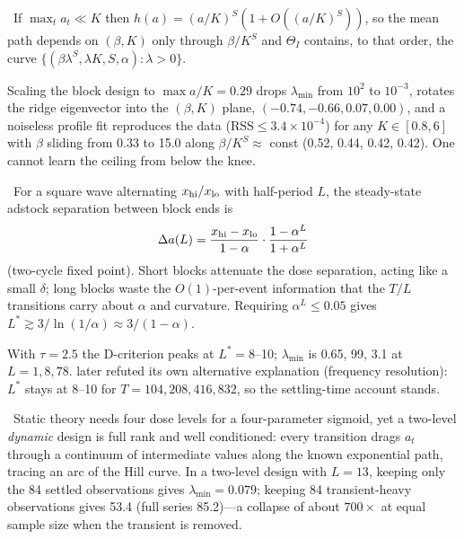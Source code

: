 \begin{proposition}
\label{ident:prop:range}
\tagTransported\ If $\max_t a_t \ll K$ then $h(a) = (a/K)^S(1 + O((a/K)^S))$, so the mean path depends on $(\beta, K)$ only through $\beta/K^S$ and $\Theta_I$ contains, to that order, the curve $\{(\beta\lambda^S, \lambda K, S, \alpha) : \lambda > 0\}$.
\end{proposition}

Scaling the block design to $\max a/K = 0.29$ drops $\lambda_{\min}$ from $10^2$ to $10^{-3}$, rotates the ridge eigenvector into the $(\beta, K)$ plane, $(-0.74, -0.66, 0.07, 0.00)$, and a noiseless profile fit reproduces the data ($\mathrm{RSS} \le 3.4\times10^{-4}$) for any $K \in [0.8, 6]$ with $\beta$ sliding from 0.33 to 15.0 along $\beta/K^S \approx$ const (0.52, 0.44, 0.42, 0.42). One cannot learn the ceiling from below the knee.

\begin{proposition}
\label{ident:prop:block}
\tagEstablished\ For a square wave alternating $x_{\rm hi}/x_{\rm lo}$ with half-period $L$, the steady-state adstock separation between block ends is
\begin{equation}
\Delta a(L) = \frac{x_{\rm hi} - x_{\rm lo}}{1-\alpha}\cdot\frac{1 - \alpha^L}{1 + \alpha^L}
\label{ident:eq:blocklength}
\end{equation}
(two-cycle fixed point). Short blocks attenuate the dose separation, acting like a small $\delta$; long blocks waste the $O(1)$-per-event information that the $T/L$ transitions carry about $\alpha$ and curvature. Requiring $\alpha^L \le 0.05$ gives $L^* \gtrsim 3/\ln(1/\alpha) \approx 3/(1-\alpha)$.
\end{proposition}

With $\tau = 2.5$ the D-criterion peaks at $L^* = 8$--10; $\lambda_{\min}$ is 0.65, 99, 3.1 at $L = 1, 8, 78$.  later refuted its own alternative explanation (frequency resolution): $L^*$ stays at 8--10 for $T = 104, 208, 416, 832$, so the settling-time account stands.

\begin{proposition}
\label{ident:prop:transient}
\tagNumerical\ Static theory needs four dose levels for a four-parameter sigmoid, yet a two-level \emph{dynamic} design is full rank and well conditioned: every transition drags $a_t$ through a continuum of intermediate values along the known exponential path, tracing an arc of the Hill curve. In a two-level design with $L = 13$, keeping only the 84 settled observations gives $\lambda_{\min} = 0.079$; keeping 84 transient-heavy observations gives 53.4 (full series 85.2)---a collapse of about $700\times$ at equal sample size when the transient is removed.
\end{proposition}

